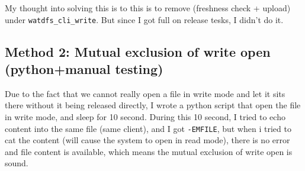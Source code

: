 \documentclass[11pt,a4paper]{article}
\begin{document}
My thought into solving this is to this is to remove (freshness check + upload) under \texttt{watdfs\_cli\_write}. But since I got full on release tesks, I didn't do it.

\subsection{Method 2: Mutual exclusion of write open (python+manual testing)}

Due to the fact that we cannot really open a file in write mode and let it sits there without it being released directly, I wrote a python script that open the file in write mode, and sleep for 10 second. During this 10 second, I tried to echo content into the same file (same client), and I got \texttt{-EMFILE}, but when i tried to cat the content (will cause the system to open in read mode), there is no error and file content is available, which means the mutual exclusion of write open is sound.
\end{document}

